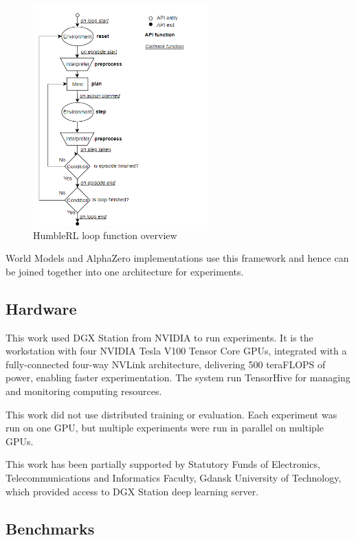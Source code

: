 \begin{figure}[H]
\includegraphics[width=0.6\textwidth,keepaspectratio]{figures/HumbleRL/loop.png}
\caption{HumbleRL loop function overview}
\label{Fig.HRL_loop}
\end{figure}

World Models and AlphaZero implementations use this framework and hence can be joined together into one architecture for experiments.

\subsection{Hardware}

This work used DGX Station from NVIDIA to run experiments. It is the workstation with four NVIDIA Tesla V100 Tensor Core GPUs, integrated with a fully-connected four-way NVLink architecture, delivering 500 teraFLOPS of power, enabling faster experimentation. The system run TensorHive \cite{Code.TensorHive} for managing and monitoring computing resources.

This work did not use distributed training or evaluation. Each experiment was run on one GPU, but multiple experiments were run in parallel on multiple GPUs.

This work has been partially supported by Statutory Funds of Electronics, Telecommunications and Informatics Faculty, Gdansk University of Technology, which provided access to DGX Station deep learning server.

\subsection{Benchmarks}

